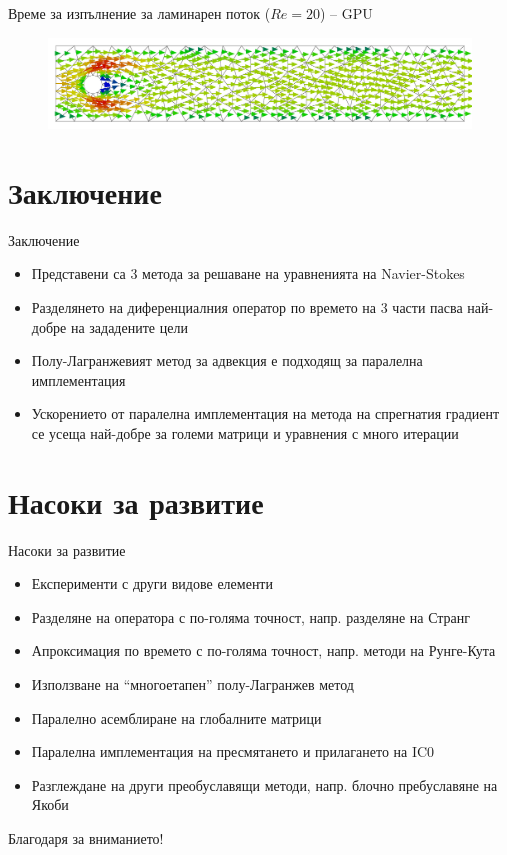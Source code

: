 \documentclass{beamer}
\begin{document}
\begin{frame}{Време за изпълнение за ламинарен поток ($Re = 20$) -- GPU}
\begin{figure}[H]
\centering
\includegraphics[width=\textwidth]{../Figures/01_introduction/P2P1_adv_diff_100.pdf}
\end{figure}

\end{frame}

\section{Заключение}
\begin{frame}{Заключение}
\begin{itemize}
	\item Представени са 3 метода за решаване на уравненията на Navier-Stokes
	\item Разделянето на диференциалния оператор по времето на 3 части пасва най-добре на зададените цели
	\item Полу-Лагранжевият метод за адвекция е подходящ за паралелна имплементация
	\item Ускорението от паралелна имплементация на метода на спрегнатия градиент се усеща най-добре за големи матрици и уравнения с много итерации
\end{itemize}
\end{frame}

\section{Насоки за развитие}
\begin{frame}{Насоки за развитие}
	\begin{itemize}
		\item Експерименти с други видове елементи
		\item Разделяне на оператора с по-голяма точност, напр. разделяне на Странг
		\item Апроксимация по времето с по-голяма точност, напр. методи на Рунге-Кута
		\item Използване на ``многоетапен'' полу-Лагранжев метод
		\item Паралелно асемблиране на глобалните матрици
		\item Паралелна имплементация на пресмятането и прилагането на IC0
		\item Разглеждане на други преобуславящи методи, напр. блочно пребуславяне на Якоби
	\end{itemize}
\end{frame}

\begin{frame}
	\centering
	\Large
	Благодаря за вниманието!
\end{frame}
\end{document}

